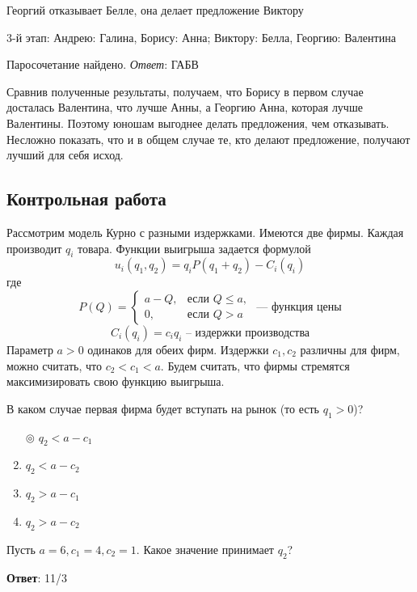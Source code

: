 	Георгий отказывает Белле, она делает предложение Виктору
	
	3-й этап: Андрею: Галина, Борису: Анна; Виктору: Белла, Георгию: Валентина
	
	Паросочетание найдено. \textit{Ответ}: ГАБВ
	
	Сравнив полученные результаты, получаем, что Борису в первом случае досталась Валентина, что лучше Анны, а Георгию Анна, которая лучше Валентины. Поэтому юношам выгоднее делать предложения, чем отказывать. Несложно показать, что и в общем случае те, кто делают предложение, получают лучший для себя исход.
	
	
	
	
	
	
	
\subsection{Контрольная работа}

\task
Рассмотрим модель Курно с разными издержками. Имеются две фирмы. Каждая производит $q_i$ товара. Функции выигрыша задается формулой
\[
	u_i (q_1, q_2) = q_i P(q_1 + q_2) - C_i (q_i)
\]
где
\[
P(Q) =
	\begin{cases}
	a - Q, & \text{если } Q \leq a, \\
	0, & \text{если } Q > a
	\end{cases} \text{ --- функция цены}
\]
\[
	C_i (q_i) = c_i q_i \text{ -- издержки производства}
\]
Параметр $a > 0$ одинаков для обеих фирм. Издержки $c_1, c_2$ различны для фирм, можно считать, что $c_2 < c_1 < a$. Будем считать, что фирмы стремятся максимизировать свою функцию выигрыша.

В каком случае первая фирма будет вступать на рынок (то есть $q_1 > 0$)?

\begin{enumerate}[label=$\circ$]
	\item[$\circledcirc$] $q_2 < a - c_1$
	\item $q_2 < a - c_2$
	\item $q_2 > a - c_1$
	\item $q_2 > a - c_2$
\end{enumerate}

\solution %

\task
Пусть $a = 6, c_1 = 4, c_2 = 1$. Какое значение принимает $q_2$?

\textbf{Ответ}: 
11/3

\solution %


